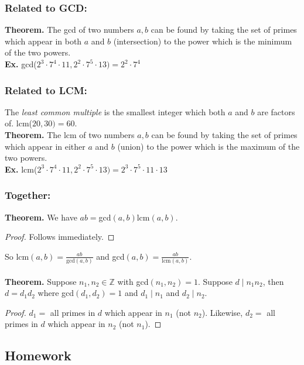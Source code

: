 \documentclass[class=article, crop=false]{standalone}
\def\integers{{\mathbb Z}}
\begin{document}
\subsubsection*{Related to GCD:}
\textbf{Theorem.} The gcd of two numbers $a,b$ can be found by taking the set of primes which appear in both
$a$ and $b$ (intersection) to the power which is the minimum of the two powers.\\
\textbf{Ex.} gcd($2^3\cdot7^4\cdot11, 2^2\cdot7^5\cdot13)=2^2\cdot 7^4$
\subsubsection*{Related to LCM:}
The \emph{least common multiple} is the smallest integer which both $a$ and $b$ are factors of. lcm($20,30)=60$.\\
\textbf{Theorem.} The lcm of two numbers $a,b$ can be found by taking the set of primes which appear in either $a$ and $b$
(union) to the power which is the maximum of the two powers.\\
\textbf{Ex.} lcm($2^3\cdot7^4\cdot11, 2^2\cdot7^5\cdot13)=2^3\cdot 7^5\cdot11\cdot13$
\subsubsection*{Together:}
\textbf{Theorem.} We have $ab = $gcd$(a,b)$lcm$(a,b)$.
\begin{proof}
	Follows immediately.
\end{proof}
\noindent So lcm$(a,b)=\frac{ab}{\text{gcd}(a,b)}$ and gcd$(a,b)=\frac{ab}{\text{lcm}(a,b)}$.
\\\\
\textbf{Theorem.} Suppose $n_1, n_2\in\integers$ with gcd$(n_1,n_2)=1$. Suppose $d\mid n_1 n_2$,
then $d=d_1 d_2$ where gcd$(d_1, d_2)=1$ and $d_1\mid n_1$ and $d_2\mid n_2$.
\begin{proof}
	$d_1=$ all primes in $d$ which appear in $n_1$ (not $n_2$). Likewise, $d_2=$ all primes in $d$ which appear in
	$n_2$ (not $n_1$).
\end{proof}
\subsection{Homework}
\end{document}
